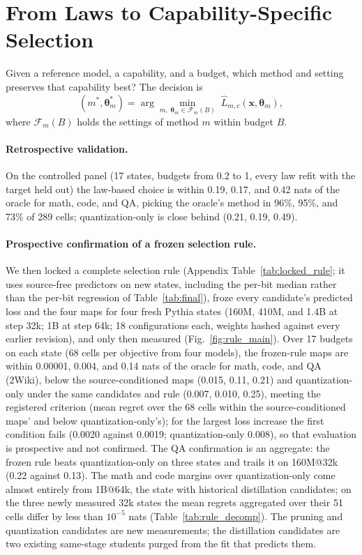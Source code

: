 \section{From Laws to Capability-Specific Selection}
\label{sec:selection}


Given a reference model, a capability, and a budget, which method
and setting preserves that capability best? The decision is
\begin{equation}
(m^{*},\boldsymbol\theta_m^{*})=\arg\min_{m,\;\boldsymbol\theta_m\in\mathcal F_m(B)}\;
\widehat L_{m,c}(\mathbf x,\boldsymbol\theta_m),
\label{eq:selection}
\end{equation}
where $\mathcal F_m(B)$ holds the settings of method $m$ within
budget $B$. 



\paragraph{Retrospective validation.} On the controlled panel (17
states, budgets from 0.2 to 1, every law refit with the target held
out) the law-based choice is within 0.19, 0.17, and 0.42 nats of the
oracle for math, code, and QA, picking the oracle's method in 96\%,
95\%, and 73\% of 289 cells; quantization-only is close behind (0.21,
0.19, 0.49).

\paragraph{Prospective confirmation of a frozen selection rule.} We then locked a complete selection rule (Appendix
Table~\ref{tab:locked_rule}; it uses source-free predictors on new
states, including the per-bit median rather than the per-bit
regression of Table~\ref{tab:final}), froze every candidate's
predicted loss and the four maps for four fresh Pythia states (160M,
410M, and 1.4B at step 32k; 1B at step 64k; 18 configurations each,
weights hashed against every earlier revision), and only then
measured (Fig.~\ref{fig:rule_main}). Over 17 budgets on each state (68 cells per objective from four
models), the frozen-rule maps are within 0.00001, 0.004, and 0.14
nats of the oracle for math, code, and QA (2Wiki), below the
source-conditioned maps (0.015, 0.11, 0.21) and quantization-only
under the same candidates and rule (0.007, 0.010, 0.25), meeting the registered criterion (mean regret over the 68 cells within the source-conditioned maps' and below quantization-only's); for the largest loss increase the first condition fails (0.0020 against 0.0019; quantization-only 0.008), so that evaluation is prospective and not confirmed. The QA confirmation is an aggregate: the frozen
rule beats quantization-only on three states and trails it on
160M@32k (0.22 against 0.13). The math and code margins over
quantization-only come almost entirely from 1B@64k, the state with
historical distillation candidates; on the three newly measured 32k states the mean regrets aggregated over their 51 cells differ by less than $10^{-5}$ nats (Table~\ref{tab:rule_decomp}).  The pruning and quantization candidates are new measurements; the distillation candidates are two existing same-stage students purged from the fit that predicts them. 


